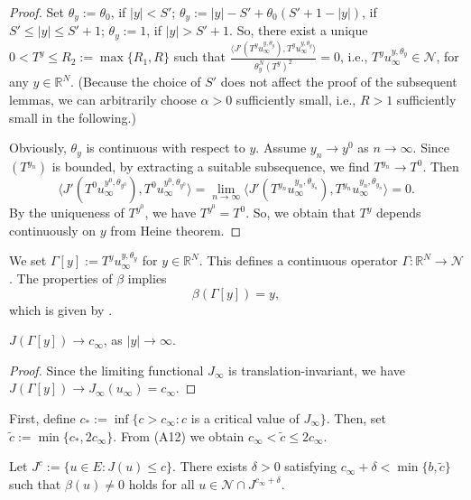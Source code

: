 \documentclass[reqno]{amsart}
\begin{document}
\begin{proof}
Set $\theta_y:=\theta_0$, if $|y|<S'$; $\theta_y:=|y|-S'+\theta_0(S'+1-|y|)$, if 
$S'\leq|y|\leq S'+1$;
$\theta_y:=1$, if $|y|>S'+1$. So, there exist a unique $0<T^y\leq R_2:=\max \{R_1,R\}$ 
such that $\frac{\langle J'(T^yu_{\infty}^{y,\theta_y}),T^yu_{\infty}^{y,\theta_y}\rangle}{\theta^N_y(T^y)^{2}}=0$, i.e., $T^y u_{\infty}^{y,\theta_y}\in\mathcal{N}$, for any $y\in{\mathbb{R}^N}$. (Because the choice of $S'$ does not affect the proof of the subsequent lemmas, we can 
arbitrarily choose $\alpha > 0$ sufficiently small, i.e., $R > 1$ sufficiently small in the following.)

Obviously, $\theta_y$ is continuous with respect to $y$. 
Assume $y_n\to y^0$ as $n\to\infty$. Since $(T^{y_n})$ is bounded, by extracting a suitable subsequence, we find $T^{y_n}\to T^0$. Then 
$$
\langle J'(T^0u_{\infty}^{y^0,\theta_{y^0}}),T^0u_{\infty}^{y^0,\theta_{y^0}}\rangle=\lim_{n\to\infty}\langle J'(T^{y_n}u_{\infty}^{y_n,\theta_{y_n}}),T^{y_n}u_{\infty}^{y_n,\theta_{y_n}}\rangle=0.
$$ 
By the uniqueness of $T^{y^0}$, we have $T^{y^0}=T^0$. So, we obtain that $T^y$  depends continuously on $y$ from Heine theorem.
\end{proof}

We set \(\Gamma[y] := T^y u_{\infty}^{y,\theta_y}\) for \(y \in \mathbb{R}^N\). 
This defines a continuous operator \(\Gamma: \mathbb{R}^N \to \mathcal{N}\). 
The properties of $\beta$ implies
\begin{equation}
\label{q8}\beta(\Gamma[y])=y, 
\end{equation} 
which is given by \cite[Lemma 3.13 ]{Lehrer}.

\begin{lemma}\label{L3.15} 
$J(\Gamma[y])\to c_\infty$, as $|y|\to\infty$.
\end{lemma}

\begin{proof}
Since the limiting functional $J_\infty$ is translation-invariant, we have 
$J(\Gamma[y]) \to J_\infty(u_\infty) = c_\infty$.
\end{proof}

First, define $c_*:=\inf\{c>c_\infty: c$ is a critical value of $J_\infty\}$. 
Then, set $\tilde{c}:=\min\{c_*,2c_\infty\}$. From (A12) we obtain 
$c_\infty<\tilde{c}\leq 2c_\infty$.

\begin{lemma}\label{L3.16} 
Let $J^c:=\{u\in E:J(u)\leq c\}$. There exists $\delta>0$  satisfying 
$c_\infty+\delta<\min\{b,\tilde{c}\}$ such that $\beta(u)\neq0$ holds for
all $u\in\mathcal{N}\cap J^{c_\infty+\delta}$. 
\end{lemma}
\end{document}
